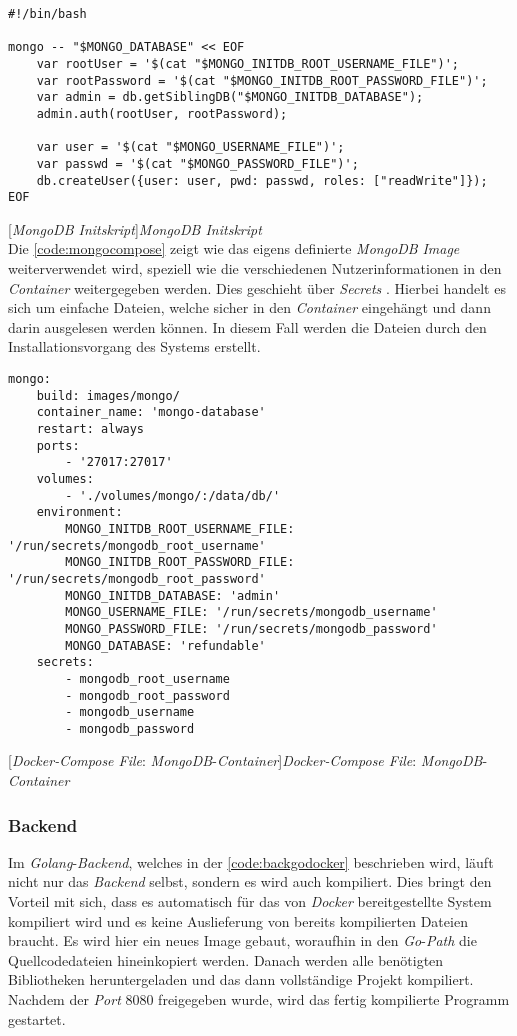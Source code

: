 \newpage

\begin{verbatim}
#!/bin/bash

mongo -- "$MONGO_DATABASE" << EOF
	var rootUser = '$(cat "$MONGO_INITDB_ROOT_USERNAME_FILE")';
	var rootPassword = '$(cat "$MONGO_INITDB_ROOT_PASSWORD_FILE")';
	var admin = db.getSiblingDB("$MONGO_INITDB_DATABASE");
	admin.auth(rootUser, rootPassword);

	var user = '$(cat "$MONGO_USERNAME_FILE")';
	var passwd = '$(cat "$MONGO_PASSWORD_FILE")';
	db.createUser({user: user, pwd: passwd, roles: ["readWrite"]});
EOF
\end{verbatim}
[\textit{MongoDB Initskript}]{\textit{MongoDB Initskript}}
\label{code:mongoskript}
~\\
Die \autoref{code:mongocompose} zeigt wie das eigens definierte \textit{MongoDB} \textit{Image} weiterverwendet wird, speziell wie die verschiedenen Nutzerinformationen in den \textit{Container} weitergegeben werden. Dies geschieht über \textit{Secrets} \cite{secretmongo}. Hierbei handelt es sich um einfache Dateien, welche sicher in den \textit{Container} eingehängt und dann darin ausgelesen werden können. In diesem Fall werden die Dateien durch den Installationsvorgang des Systems erstellt. 

\begin{verbatim}
mongo:
	build: images/mongo/
	container_name: 'mongo-database'
	restart: always
	ports:
		- '27017:27017'
	volumes:
		- './volumes/mongo/:/data/db/'
	environment:
		MONGO_INITDB_ROOT_USERNAME_FILE: '/run/secrets/mongodb_root_username'
		MONGO_INITDB_ROOT_PASSWORD_FILE: '/run/secrets/mongodb_root_password'
		MONGO_INITDB_DATABASE: 'admin'
		MONGO_USERNAME_FILE: '/run/secrets/mongodb_username'
		MONGO_PASSWORD_FILE: '/run/secrets/mongodb_password'
		MONGO_DATABASE: 'refundable'
	secrets:
		- mongodb_root_username
		- mongodb_root_password
		- mongodb_username
		- mongodb_password
\end{verbatim}
[\textit{Docker-Compose File}: \textit{MongoDB}-\textit{Container}]{\textit{Docker-Compose File}: \textit{MongoDB}-\textit{Container}}
\label{code:mongocompose}

\newpage

\subsubsection{Backend}

Im \textit{Golang}-\textit{Backend}, welches in der \autoref{code:backgodocker} beschrieben wird, läuft nicht nur das \textit{Backend} selbst, sondern es wird auch kompiliert. Dies bringt den Vorteil mit sich, dass es automatisch für das von \textit{Docker} bereitgestellte System kompiliert wird und es keine Auslieferung von bereits kompilierten Dateien braucht. Es wird hier ein neues Image gebaut, woraufhin in den \textit{Go}-\textit{Path} die Quellcodedateien hineinkopiert werden. Danach werden alle benötigten Bibliotheken heruntergeladen und das dann vollständige Projekt kompiliert. Nachdem der \textit{Port} 8080 freigegeben wurde, wird das fertig kompilierte Programm gestartet.

